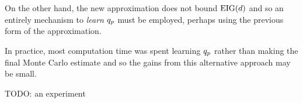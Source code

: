 On the other hand, the new approximation does not bound $\text{EIG}(d)$ and so an entirely mechanism to \textit{learn} $q_p$ must be employed, perhaps using the previous form of the approximation.

In practice, most computation time was spent learning $q_p$ rather than making the final Monte Carlo estimate and so the gains from this alternative approach may be small.

TODO: an experiment